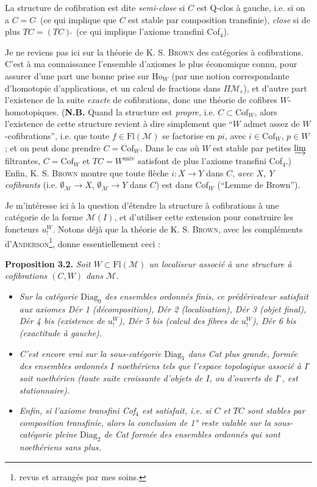\documentclass[11pt]{article}
\newcommand{\printedpage}[1]{\marginpar{\footnotesize p.~#1}}
\newcommand{\msp}[1]{\marginpar{\footnotesize [#1]}}
\newcommand{\M}{\mathcal{M}}
\newcommand{\Ho}{\mathrm{Ho}}
\newcommand{\Fl}{\mathrm{Fl}}
\newcommand{\Cof}{\mathrm{Cof}}
\newcommand{\Diag}{\mathrm{Diag}}
\newcommand{\Qs}{\tilde{\ }}
\begin{document}
La structure de cofibration est dite \textit{semi-close} si $C$ est Q-clos à gauche, i.e. si on a $C=C\Qs$ (ce qui implique que $C$ est stable par composition transfinie), \textit{close} si de plus $TC=(TC)\Qs$ (ce qui implique l'axiome transfini Cof$_4$).

\msp{page 35}
Je ne reviens pas ici sur la théorie de K. S. \textsc{Brown} des catégories à cofibrations. C'est à ma connaissance l'ensemble d'axiomes le plus économique connu, pour assurer d'une part une bonne prise sur $\Ho_W$ (par une notion correspondante d'homotopie d'applications, et un calcul de fractions dans $\Pi\M_{\mathrm{c}}$), et d'autre part l'existence de la suite \textit{exacte} de cofibrations, donc une théorie de cofibres $W$-homotopiques. (\textbf{N.B.} Quand la structure est \textit{propre,} i.e. $C\subset\Cof_W$, alors l'existence de cette structure revient à dire simplement que ``$W$ admet assez de $W$-cofibrations'', i.e. que toute $f\in\Fl(\M)$ se factorise en $pi$, avec $i\in\Cof_W$, $p\in W$ ; et on peut donc prendre $C=\Cof_W$. Dans le cas où $W$ est stable par petites $\varinjlim$ filtrantes, $C=\Cof_W$ et $TC=W^{\mathrm{univ}}$ satisfont de plus l'axiome transfini Cof$_4$.) Enfin, K. S. \textsc{Brown} montre que toute flèche $i : X\longrightarrow Y$ dans $C$, \textit{avec $X$, $Y$ cofibrants} (i.e. $\emptyset_{\M}\longrightarrow X$, $\emptyset_{\M}\longrightarrow Y$ dans $C$) est dans $\Cof_W$ (``Lemme de Brown'').

Je m'intéresse ici à la question d'étendre la structure à cofibrations à une catégorie de la forme $\M(I)$, et d'utiliser cette extension pour construire
\msp{page 36}
les foncteurs $u^{W}_{!}$. Notons déjà que la théorie de K. S. \textsc{Brown}, avec les compléments d'\textsc{Anderson}\footnote[20]{revus et arrangés par mes soins.}, donne essentiellement ceci :

\printedpage{21}

\textbf{Proposition 3.2.} \textit{Soit $W\subset\Fl(\M)$ un localiseur associé à une structure à cofibrations $(C,W)$ dans $\M$.}
\begin{itemize}[leftmargin=3em,labelwidth=2.5em,align=right]
\item[1°)] \textit{Sur la catégorie \textup{$\Diag_0$} des ensembles ordonnés \textup{finis}, ce prédérivateur satisfait aux axiomes Dér 1 (décomposition), Dér 2 (localisation), Dér 3 (objet final), Dér 4 bis (existence de $u^{W}_{!}$), Dér 5 bis (calcul des fibres de $u^{W}_{!}$), Dér 6 bis (exactitude à gauche).}
\item[2°)] \textit{C'est encore vrai sur la sous-catégorie \textup{$\Diag_1$} dans \textup{Cat} plus grande, formée des ensembles ordonnés $I$ \textup{noethériens} tels que l'espace topologique associé à $I^{\circ}$ soit noethérien (toute suite croissante d'objets de $I$, ou d'ouverts de $I^{\circ}$, est stationnaire).}
\item[3°)] \textit{Enfin, si l'axiome transfini Cof$_4$ est satisfait, i.e. si $C$ et $TC$ sont stables par composition transfinie, alors la conclusion de \textup{1°} reste valable sur la sous-catégorie pleine \textup{$\Diag_2$} de \textup{Cat} formée des ensembles ordonnés qui sont noethériens sans plus.}
\end{itemize}
\end{document}
